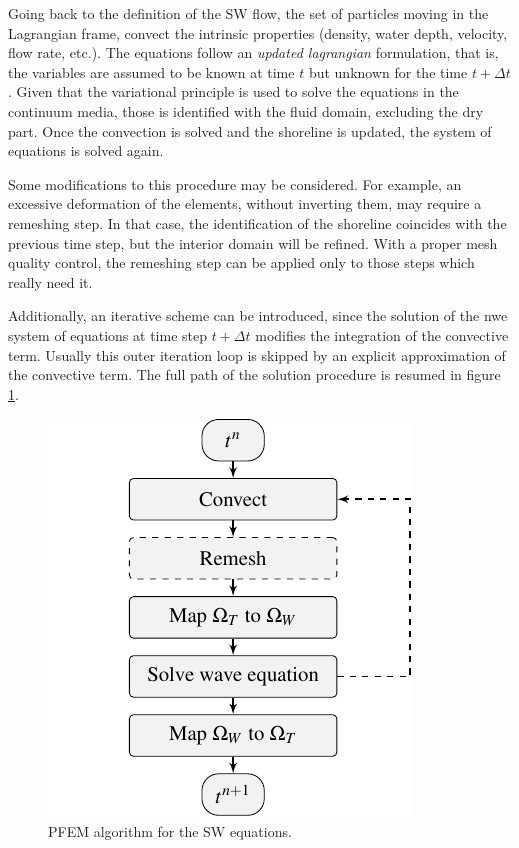 Going back to the definition of the SW flow, the set of particles moving in the Lagrangian frame, convect the intrinsic properties (density, water depth, velocity, flow rate, etc.). The equations follow an \emph{updated lagrangian} formulation, that is, the variables are assumed to be known at time $t$ but unknown for the time $t+\Delta t$. Given that the variational principle is used to solve the equations in the continuum media, those is identified with the fluid domain, excluding the dry part. Once the convection is solved and the shoreline is updated, the system of equations is solved again.

Some modifications to this procedure may be considered. For example, an excessive deformation of the elements, without inverting them, may require a remeshing step. In that case, the identification of the shoreline coincides with the previous time step, but the interior domain will be refined. With a proper mesh quality control, the remeshing step can be applied only to those steps which really need it.

Additionally, an iterative scheme can be introduced, since the solution of the nwe system of equations at time step $t + \Delta t$ modifies the integration of the convective term. Usually this outer iteration loop is skipped by an explicit approximation of the convective term. The full path of the solution procedure is resumed in figure \ref{sw_pfem_algorithm}.

\begin{figure} [ht]
    \centering
    \includegraphics[width=.6\textwidth]{img/lagrangian/sw_pfem_algorithm.pdf}
    \caption{PFEM algorithm for the SW equations.}
    \label{sw_pfem_algorithm}
\end{figure}





